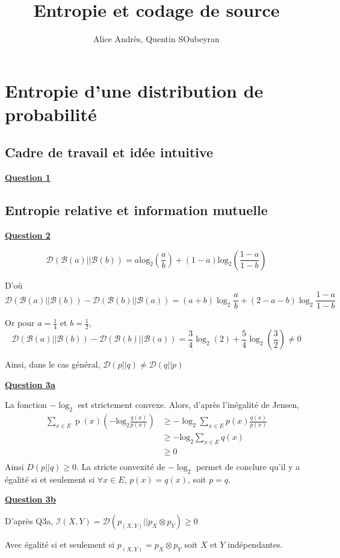 \documentclass[a4paper,twoside,10pt]{article}
\title{Entropie et codage de source}
\author{Alice Andrès, Quentin SOubeyran}
\newcommand{\I}{\mathcal{I}}
\newcommand{\B}{\mathcal{B}}
\newcommand{\D}{\mathcal{D}}
\newenvironment{Q}[1]{%
\vspace{1ex}
\underline{\textbf{Question #1\\}}
\newline
}{
\vspace{2ex}
}
\begin{document}
\maketitle

\section{Entropie d'une distribution de probabilité}

\subsection{Cadre de travail et idée intuitive}
\begin{Q}{1}

\end{Q}
\subsection{Entropie relative et information mutuelle}
\begin{Q}{2}
\[
\D(\B(a)||\B(b))
= a \operatorname{log_2}(\frac{a}{b}) + (1-a) \operatorname{log_2}(\frac{1-a}{1-b})
\]

D'où
\[\D(\B(a)||\B(b))  - \D(\B(b)||\B(a)) 
= (a+b)\log_2{\frac{a}{b}} + (2-a-b)\log_2{\frac{1-a}{1-b}}
\]

Or pour $a = \frac{1}{4}$ et $b = \frac{1}{2}$, 
\[
\D(\B(a)||\B(b))  - \D(\B(b)||\B(a))
= \frac{3}{4} \log_2{(2)} + \frac{5}{4} \log_2{(\frac{3}{2})} \neq 0
\]


Ainsi, dans le cas général, $ \D (p||q) \neq \D(q||p)$
\end{Q}

\begin{Q}{3a}
La fonction $- \log_2$ est strictement convexe. Alors, d'après l'inégalité de Jensen,
\begin{align*}
\sum_{x \in E} \operatorname{p}(x) \left(
	- \operatorname{log_2}\frac{q(x)}{p(x)}
	\right) &\geq 
		-\log_2{\sum_{x \in E} p(x) \frac{q(x)}{p(x)}} \\
&\geq -\operatorname{log_2} \sum_{x \in E}q(x) \\
&\geq 0 \\
\end{align*}
Ainsi $D(p||q) \geq 0$.
La stricte convexité de $-\log_2$ permet de conclure qu'il y a égalité si et seulement si $\forall x \in E$, $p(x) = q(x)$, soit $p=q$. 
\end{Q}

\begin{Q}{3b}

D'après Q3a, $\I(X,Y) = \D(p_{(X,Y)} || p_X \otimes p_Y) \geq 0$

Avec égalité si et seulement si $p_{(X,Y)} = p_X \otimes p_Y$ soit $X$ et $Y$ indépendantes.
\end{Q}
\end{document}
